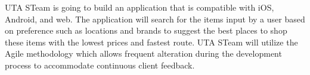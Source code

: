UTA STeam is going to build an application that is compatible with iOS, Android, and web. The application will search for the items input by a user based on preference such as locations and brands to suggest the best places to shop these items with the lowest prices and fastest route. UTA STeam will utilize the Agile methodology which allows frequent alteration during the development process to accommodate continuous client feedback.